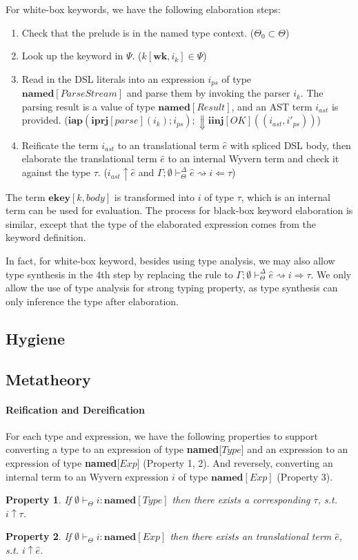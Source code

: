 \documentclass{sig-alternate}
\newcommand{\myvdash}{\vdash_{\Theta}^{\Delta}}
\newtheorem{property}{Property}
\begin{document}
For white-box keywords, we have the following elaboration steps:
\begin{enumerate}\setlength{\itemsep}{0pt}
\item Check that the prelude is in the named type context. ($\Theta_0\subset\Theta$)
\item Look up the keyword in $\Psi$. ($k[\mathbf{wk},i_k]\in\Psi$)
\item Read in the DSL literals into an expression $i_{ps}$ of type $\mathbf{named}[ParseStream]$ and parse them by invoking the parser $i_k$. The parsing result is a value of type $\mathbf{named}[Result]$, and an AST term $i_{ast}$ is provided. ($\mathbf{iap}(\mathbf{iprj}[parse](i_k); i_{ps});\Downarrow \mathbf{iinj}[OK]((i_{ast}, i'_{ps}))$)
\item Reificate the term $i_{ast}$ to an translational term $\hat{e}$ with spliced DSL body, then elaborate the translational term $\hat{e}$ to an internal Wyvern term and check it against the type $\tau$. ($i_{ast}\uparrow \hat{e}$ and $\Gamma;\emptyset\myvdash \hat{e} \rightsquigarrow i \Leftarrow \tau$)
\end{enumerate}
The term $\mathbf{ekey}[k,body]$ is transformed into $i$ of type $\tau$, which is an internal term can be used for evaluation. The process for black-box keyword elaboration is similar, except that the type of the elaborated expression comes from the keyword definition. 

In fact, for white-box keyword, besides using type analysis, we may also allow type synthesis in the 4th step by replacing the rule to  $\Gamma;\emptyset\myvdash \hat{e} \rightsquigarrow i \Rightarrow \tau$. We only allow the use of type analysis for strong typing property, as type synthesis can only inference the type after elaboration.


\subsection{Hygiene}

\subsection{Metatheory}
\paragraph{Reification and Dereification}
For each type and expression, we have the following properties to support converting a type to an expression of type \textbf{named}[$Type$] and an expression to an expression of type \textbf{named}[$Exp$] (Property 1, 2). And reversely, converting an internal term to an Wyvern expression $i$ of type $\mathbf{named}[Exp]$ (Property 3).  
\begin{property}If $\emptyset\vdash_{\Theta} i:\mathbf{named}[Type]$ then there exists a corresponding $\tau$, s.t. $i\uparrow\tau$. 
\end{property}
\begin{property}
If $\emptyset\vdash_{\Theta} i:\mathbf{named}[Exp]$ then there exists an translational term $\hat{e}$, s.t. $i\uparrow\hat{e}$.
\end{property}
\end{document}
